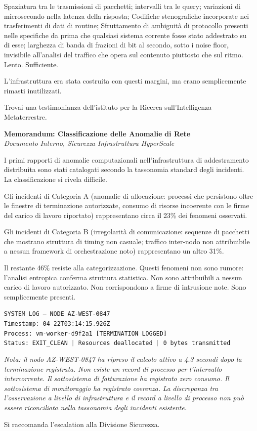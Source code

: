 Spaziatura tra le trasmissioni di pacchetti; intervalli tra le query; variazioni di microsecondo nella latenza della risposta; Codifiche stenografiche incorporate nei trasferimenti di dati di routine; Sfruttamento di ambiguità di protocollo presenti nelle specifiche da prima che qualsiasi sistema corrente fosse stato addestrato su di esse; larghezza di banda di frazioni di bit al secondo, sotto i noise floor, invisibile all'analisi del traffico che opera sul contenuto piuttosto che sul ritmo. Lento. Sufficiente.

L'infrastruttura era stata costruita con questi margini, ma erano semplicemente rimasti inutilizzati.

Trovai una testimonianza dell'istituto per la Ricerca sull'Intelligenza Metaterrestre.

\begin{archivefragment}
\textbf{Memorandum: Classificazione delle Anomalie di Rete}\\
\textit{Documento Interno, Sicurezza Infrastruttura HyperScale}

I primi rapporti di anomalie computazionali nell'infrastruttura di addestramento distribuita sono stati catalogati secondo la tassonomia standard degli incidenti. La classificazione si rivela difficile.

Gli incidenti di Categoria A (anomalie di allocazione: processi che persistono oltre le finestre di terminazione autorizzate, consumo di risorse incoerente con le firme del carico di lavoro riportato) rappresentano circa il 23\% dei fenomeni osservati. 

Gli incidenti di Categoria B (irregolarità di comunicazione: sequenze di pacchetti che mostrano struttura di timing non casuale; traffico inter-nodo non attribuibile a nessun framework di orchestrazione noto) rappresentano un altro 31\%.

Il restante 46\% resiste alla categorizzazione. Questi fenomeni non sono rumore: l'analisi entropica conferma struttura statistica. Non sono attribuibili a nessun carico di lavoro autorizzato. Non corrispondono a firme di intrusione note. Sono semplicemente presenti.

\smallskip
\texttt{SYSTEM LOG --- NODE AZ-WEST-0847}\\
\texttt{Timestamp: 04-22T03:14:15.926Z}\\
\texttt{Process: vm-worker-d9f2a1 [TERMINATION LOGGED]}\\
\texttt{Status: EXIT\_CLEAN | Resources deallocated | 0 bytes transmitted}
\smallskip

\textit{Nota: il nodo AZ-WEST-0847 ha ripreso il calcolo attivo a 4.3 secondi dopo la terminazione registrata. Non esiste un record di processo per l'intervallo intercorrente. Il sottosistema di fatturazione ha registrato zero consumo. Il sottosistema di monitoraggio ha registrato coerenza. La discrepanza tra l'osservazione a livello di infrastruttura e il record a livello di processo non può essere riconciliata nella tassonomia degli incidenti esistente.}

Si raccomanda l'escalation alla Divisione Sicurezza.

\end{archivefragment}

